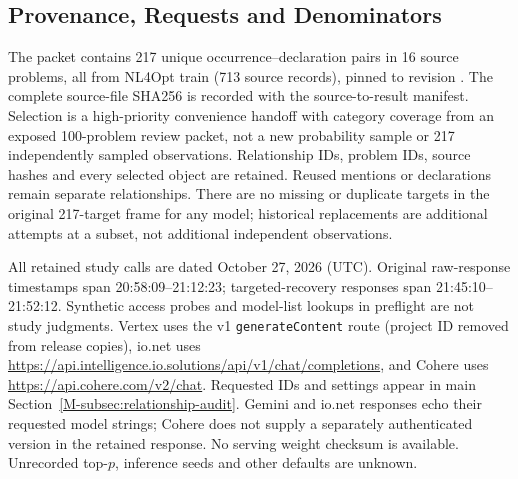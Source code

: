 \subsection{Provenance, Requests and Denominators}\label{app:relationship-evidence}
The packet contains 217 unique occurrence--declaration pairs in 16 source problems, all from NL4Opt train (713 source records), pinned to revision . The complete source-file SHA256 is recorded with the source-to-result manifest. Selection is a high-priority convenience handoff with category coverage from an exposed 100-problem review packet, not a new probability sample or 217 independently sampled observations. Relationship IDs, problem IDs, source hashes and every selected object are retained. Reused mentions or declarations remain separate relationships. There are no missing or duplicate targets in the original 217-target frame for any model; historical replacements are additional attempts at a subset, not additional independent observations.

All retained study calls are dated October 27, 2026 (UTC). Original raw-response timestamps span 20:58:09--21:12:23; targeted-recovery responses span 21:45:10--21:52:12. Synthetic access probes and model-list lookups in preflight are not study judgments. Vertex uses the v1 \texttt{generateContent} route (project ID removed from release copies), io.net uses \url{https://api.intelligence.io.solutions/api/v1/chat/completions}, and Cohere uses \url{https://api.cohere.com/v2/chat}. Requested IDs and settings appear in main Section~\ref{M-subsec:relationship-audit}. Gemini and io.net responses echo their requested model strings; Cohere does not supply a separately authenticated version in the retained response. No serving weight checksum is available. Unrecorded top-$p$, inference seeds and other defaults are unknown.

